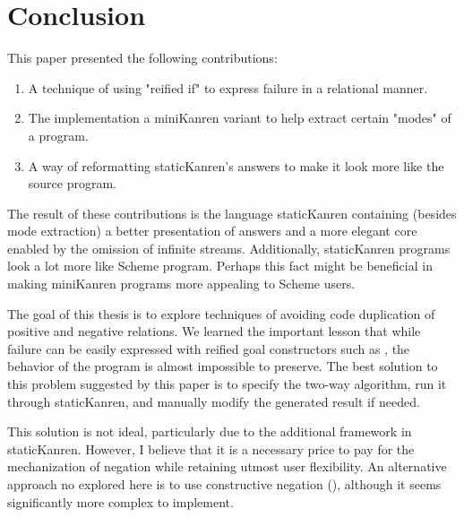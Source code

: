 \section{Conclusion}
\ifthesis
This paper presented the following contributions:
\begin{enumerate}
\item A technique of using "reified if" to express failure in a relational manner.
\item The implementation a miniKanren variant to help extract certain "modes" of a program.
\item A way of reformatting staticKanren's answers to make it look more like the source program.
\end{enumerate}
The result of these contributions is the language staticKanren containing (besides mode extraction) a better presentation of answers and a more elegant core enabled by the omission of infinite streams. Additionally, staticKanren programs look a lot more like Scheme program. Perhaps this fact might be beneficial in making miniKanren programs more appealing to Scheme users.

The goal of this thesis is to explore techniques of avoiding code duplication of positive and negative relations. We learned the important lesson that while failure can be easily expressed with reified goal constructors such as , the behavior of the program is almost impossible to preserve. The best solution to this problem suggested by this paper is to specify the two-way algorithm, run it through staticKanren, and manually modify the generated result if needed.

This solution is not ideal, particularly due to the additional framework in staticKanren. However, I believe that it is a necessary price to pay for the mechanization of negation while retaining utmost user flexibility. An alternative approach no explored here is to use constructive negation (\cite{chan}), although it seems significantly more complex to implement.
\else
\fi